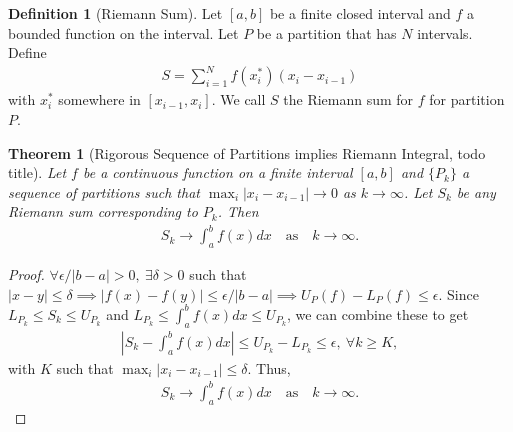 \documentclass{article}
\newtheorem{theorem}{Theorem}[section]
\numberwithin{theorem}{subsection}
\numberwithin{theorem}{subsubsection}
\numberwithin{lemma}{subsection}
\numberwithin{lemma}{subsubsection}
\theoremstyle{definition}
\newtheorem{definition}{Definition}[section]
\numberwithin{definition}{subsection}
\numberwithin{definition}{subsubsection}
\begin{document}
\begin{definition}[Riemann Sum]
    Let $[a,b]$ be a finite closed interval and $f$ a bounded function on the interval. Let $P$ be a partition that has $N$ intervals. Define
    \begin{gather}
        S = \sum_{i=1}^{N}f(x_{i}^{*})(x_{i}-x_{i-1})
    \end{gather}
    with $x_{i}^{*}$ somewhere in $[x_{i-1},x_{i}]$. We call $S$ the Riemann sum for $f$ for partition $P$.
\end{definition}

\begin{theorem}[Rigorous Sequence of Partitions implies Riemann Integral, todo title]
    Let $f$ be a continuous function on a finite interval $[a,b]$ and $\{P_{k}\}$ a sequence of partitions such that $\max_{i}|x_{i}-x_{i-1}| \rightarrow 0$ as $k \rightarrow \infty$. Let $S_{k}$ be any Riemann sum corresponding to $P_{k}$. Then
    \begin{gather}
        S_{k} \rightarrow \int_{a}^{b} f(x)dx \quad \text{as} \quad k \rightarrow \infty.
    \end{gather}
\end{theorem}
\begin{proof}
    $\forall \epsilon/|b-a| > 0,\ \exists \delta > 0$ such that $|x-y| \leq \delta \implies |f(x) - f(y)| \leq \epsilon/|b-a| \implies U_{P}(f) - L_{P}(f) \leq \epsilon$. Since $L_{P_{k}} \leq S_{k} \leq U_{P_{k}}$ and $L_{P_{k}} \leq \int_{a}^{b}f(x)dx \leq U_{P_{k}}$, we can combine these to get
    \begin{gather}
        |S_{k} - \int_{a}^{b}f(x)dx| \leq U_{P_{k}} - L_{P_{k}} \leq \epsilon,\ \forall k \geq K,
    \end{gather}
    with $K$ such that $\max_{i}|x_{i}-x_{i-1}| \leq \delta$. Thus,
    \begin{gather}
        S_{k} \rightarrow \int_{a}^{b}f(x)dx \quad \text{as} \quad k \rightarrow \infty.
    \end{gather}
\end{proof}
\end{document}
